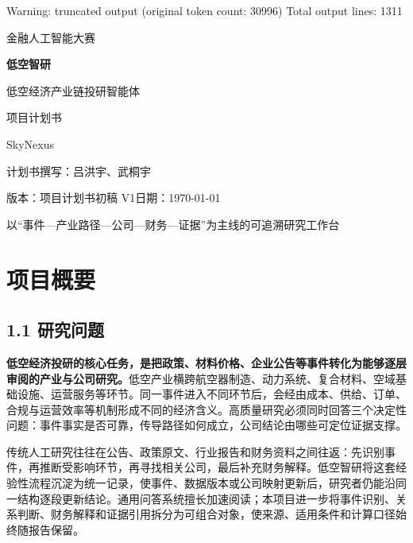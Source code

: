 Warning: truncated output (original token count: 30996)
Total output lines: 1311

\thispagestyle{empty}
\begin{center}
\vspace*{22mm}
{\Large 金融人工智能大赛\par}
\vspace{20mm}
{\Huge\bfseries 低空智研\par}
\vspace{7mm}
{\Large 低空经济产业链投研智能体\par}
\vspace{12mm}
{\LARGE 项目计划书\par}
\vspace{14mm}
{\large SkyNexus\par}
\vspace{7mm}
计划书撰写：吕洪宇、武桐宇\par
\vspace{7mm}
版本：项目计划书初稿 V1\quad 日期：\today\par
\end{center}
\vfill
\begin{center}\small
以“事件—产业路径—公司—财务—证据”为主线的可追溯研究工作台
\end{center}


\tableofcontents


\section{项目概要}
\subsection*{1.1 研究问题}\label{page:03}
\noindent\textbf{低空经济投研的核心任务，是把政策、材料价格、企业公告等事件转化为能够逐层审阅的产业与公司研究。}低空产业横跨航空器制造、动力系统、复合材料、空域基础设施、运营服务等环节。同一事件进入不同环节后，会经由成本、供给、订单、合规与运营效率等机制形成不同的经济含义。高质量研究必须同时回答三个决定性问题：事件事实是否可靠，传导路径如何成立，公司结论由哪些可定位证据支撑。

传统人工研究往往在公告、政策原文、行业报告和财务资料之间往返：先识别事件，再推断受影响环节，再寻找相关公司，最后补充财务解释。低空智研将这套经验性流程沉淀为统一记录，使事件、数据版本或公司映射更新后，研究者仍能沿同一结构逐段更新结论。通用问答系统擅长加速阅读；本项目进一步将事件识别、关系判断、财务解释和证据引用拆分为可组合对象，使来源、适用条件和计算口径始终随报告保留。

